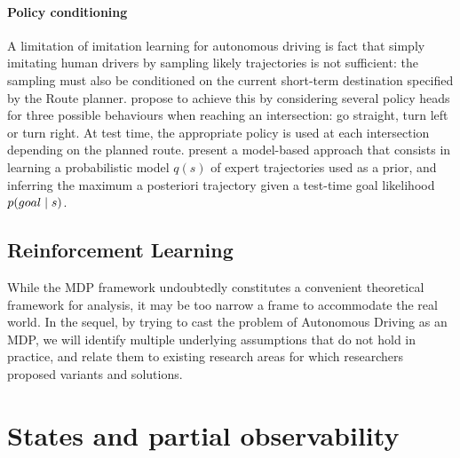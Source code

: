 \paragraph{Policy conditioning} A limitation of imitation learning for autonomous driving is fact that simply imitating human drivers by sampling likely trajectories is not sufficient: the sampling must also be conditioned on the current short-term destination specified by the Route planner. \citet{Codevilla2018} propose to achieve this by considering several policy heads for three possible behaviours when reaching an intersection: go straight, turn left or turn right. At test time, the appropriate policy is used at each intersection depending on the planned route. \citet{Rhinehart2019,Rhinehart2020} present a \gls{model-based} approach that consists in learning a probabilistic model $q(s)$ of expert trajectories used as a prior, and inferring the maximum a posteriori trajectory given a test-time goal likelihood $p\lparen goal\mid s\rparen$.

\subsection{Reinforcement Learning}

While the \gls{MDP} framework undoubtedly constitutes a convenient theoretical framework for analysis, it may be too narrow a frame to accommodate the real world. In the sequel, by trying to cast the problem of Autonomous Driving as an \gls{MDP}, we will identify multiple underlying assumptions that do not hold in practice, and relate them to existing research areas for which researchers proposed variants and solutions.

\section{States and partial observability}
\label{sec:partial-observability}

